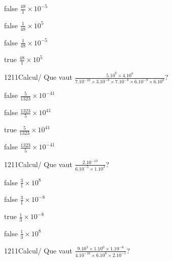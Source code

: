 \documentclass[11pt]{article}
\begin{document}
            \begin{reponses}
                \item[false] $\frac{48}{1}\times 10^{-5}$
                \item[false] $\frac{1}{48}\times 10^{5}$
                \item[false] $\frac{1}{48}\times 10^{-5}$
                \item[true] $\frac{48}{1}\times 10^{5}$
            \end{reponses}
            
            \begin{question}{1211}{Calcul}{}{/}
                Que vaut $\frac{5.10^{6}\times 4.10^{8}}{7.10^{-10}\times 3.10^{-8}\times 7.10^{-8}\times 6.10^{-9}\times 6.10^{8}}$?
            \end{question}
            
            \begin{reponses}
                \item[false] $\frac{5}{1323}\times 10^{-41}$
                \item[false] $\frac{1323}{5}\times 10^{41}$
                \item[true] $\frac{5}{1323}\times 10^{41}$
                \item[false] $\frac{1323}{5}\times 10^{-41}$
            \end{reponses}
            
            \begin{question}{1211}{Calcul}{}{/}
                Que vaut $\frac{2.10^{-10}}{6.10^{-5}\times 1.10^{3}}$?
            \end{question}
            
            \begin{reponses}
                \item[false] $\frac{3}{1}\times 10^{8}$
                \item[false] $\frac{3}{1}\times 10^{-8}$
                \item[true] $\frac{1}{3}\times 10^{-8}$
                \item[false] $\frac{1}{3}\times 10^{8}$
            \end{reponses}
            
            \begin{question}{1211}{Calcul}{}{/}
                Que vaut $\frac{9.10^{3}\times 1.10^{0}\times 1.10^{-8}}{4.10^{-10}\times 6.10^{6}\times 2.10^{-1}}$?
            \end{question}
            
\end{document}
